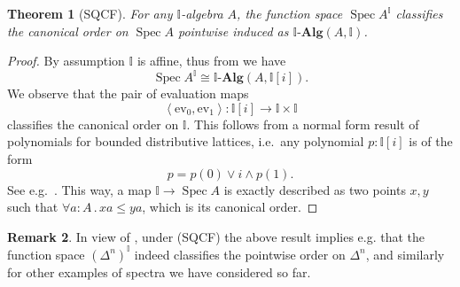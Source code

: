 \documentclass[a4paper,12pt]{amsart}
\newtheorem{theorem}{Theorem}[section]
\theoremstyle{definition}
\newtheorem{example}[theorem]{Example}
\newtheorem{definition}[theorem]{Definition}
\newtheorem{remark}[theorem]{Remark}
\newcommand{\mb}[1]{\mathbf{#1}}
\newcommand{\mbb}[1]{\mathbb{#1}}
\newcommand{\I}{\mbb I}
\newcommand{\alg}{\text{-}\mb{Alg}}
\newcommand{\pair}[1]{\left\langle#1\right\rangle}
\newcommand{\ev}{\mathrm{ev}}
\newcommand{\fa}[2]{\forall #1\!\colon\!\!#2\mathpunct{.}}
\newcommand{\spec}{\operatorname{Spec}}
\begin{document}
\begin{theorem}[SQCF]\label{thm:phoaaffine}
  For any $\I$-algebra $A$, the function space $\spec A^\I$ classifies the canonical order on $\spec A$ pointwise induced as $\I\alg(A,\I)$.
\end{theorem}
\begin{proof}
  By assumption $\I$ is affine, thus from  we have
  \[ \spec A^\I \cong \I\alg(A,\I[i]). \]
  We observe that the pair of evaluation maps
  \[ \pair{\ev_0,\ev_1} : \I[i] \to \I \times \I \]
  classifies the canonical order on $\I$. This follows from a normal form result of polynomials for bounded distributive lattices, i.e.\ any polynomial $p:\I[i]$ is of the form 
  \[ p = p(0) \vee i \wedge p(1). \]
  See e.g.~\cite[Thm. 10.11]{lausch2000algebra}. This way, a map $\I \to \spec A$ is exactly described as two points $x,y$ such that $\fa aA xa \le ya$, which is its canonical order.
\end{proof}

\begin{remark}
  In view of , under (SQCF) the above result implies e.g. that the function space $(\Delta^n)^\I$ indeed classifies the pointwise order on $\Delta^n$, and similarly for other examples of spectra we have considered so far.
\end{remark}




\end{document}

